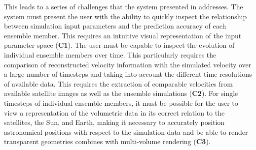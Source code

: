 This leads to a series of challenges that the system presented in  addresses.  The system must present the user with the ability to quickly inspect the relationship between simulation input parameters and the prediction accuracy of each ensemble member.  This requires an intuitive visual representation of the  input parameter space (\textbf{C1}).  The user must be capable to inspect the evolution of individual ensemble members over time.  This particularly requires the comparison of reconstructed velocity information with the simulated velocity over a large number of timesteps and taking into account the different time resolutions of available data.  This requires the extraction of comparable velocities from available satellite images as well as the ensemble simulations (\textbf{C2}).  For single timesteps of individual ensemble members, it must be possible for the user to view a representation of the volumetric data in its correct relation to the satellites, the Sun, and Earth, making it necessary to accurately position astronomical positions with respect to the simulation data and be able to render transparent geometries combines with multi-volume rendering (\textbf{C3}).


